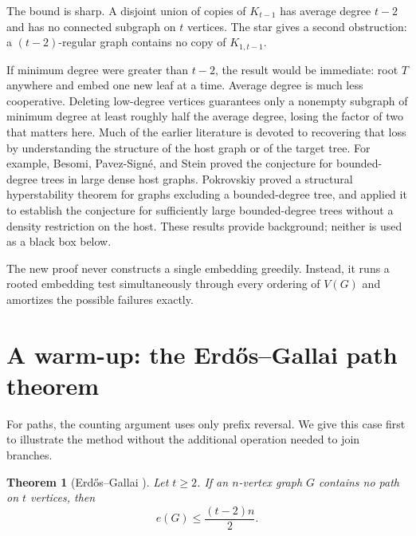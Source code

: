 \documentclass[11pt]{article}
\numberwithin{equation}{section}
\newtheorem{theorem}{Theorem}[section]
\theoremstyle{definition}
\begin{document}
The bound is sharp.  A disjoint union of copies of $K_{t-1}$ has average
degree $t-2$ and has no connected subgraph on $t$ vertices.  The star gives a
second obstruction: a $(t-2)$-regular graph contains no copy of
$K_{1,t-1}$.

If minimum degree were greater than $t-2$, the result would be immediate:
root $T$ anywhere and embed one new leaf at a time.  Average degree is much
less cooperative.  Deleting low-degree vertices guarantees only a nonempty
subgraph of minimum degree at least roughly half the average degree, losing
the factor of two that matters here.  Much of the earlier literature is
devoted to recovering that loss by understanding the structure of the host
graph or of the target tree.  For example, Besomi, Pavez-Sign\'e, and
Stein \cite{BesomiPavezSigneStein2021} proved the conjecture for bounded-degree
trees in large dense host graphs.  Pokrovskiy \cite{Pokrovskiy2024} proved a
structural hyperstability theorem for graphs excluding a bounded-degree tree,
and applied it to establish the conjecture for sufficiently large
bounded-degree trees without a density restriction on the host.
These results provide background; neither is used as a black box below.

The new proof never constructs a single embedding greedily.  Instead, it
runs a rooted embedding test simultaneously through every ordering of
$V(G)$ and amortizes the possible failures exactly.

\section{A warm-up: the Erd\H{o}s--Gallai path theorem}
\label{sec:path-warmup}

For paths, the counting argument uses only prefix reversal.  We give
this case first to illustrate the method without the additional operation
needed to join branches.

\begin{theorem}[Erd\H{o}s--Gallai \cite{ErdosGallai1959}]
\label{thm:EG-path}
Let $t\geq2$.  If an $n$-vertex graph $G$ contains no path on $t$
vertices, then
\[
        e(G)\leq\frac{(t-2)n}{2}.
\]
\end{theorem}
\end{document}
